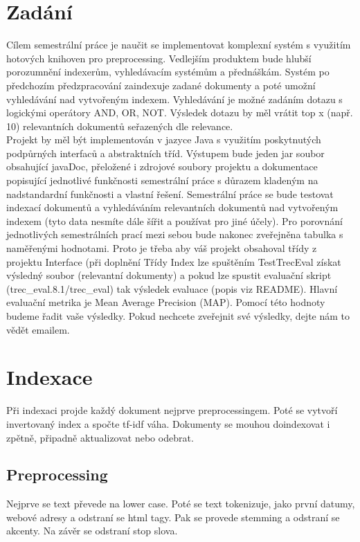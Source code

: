 \setlength{\parskip}{1em}

\chapter{Zadání}

Cílem semestrální práce je naučit se implementovat komplexní systém s využitím hotových knihoven pro preprocessing. Vedlejším produktem bude hlubší porozumnění indexerům, vyhledávacím systémům a přednáškám.
Systém po předchozím předzpracování zaindexuje zadané dokumenty a poté umožní vyhledávání nad vytvořeným indexem. Vyhledávání je možné zadáním dotazu s logickými operátory AND, OR, NOT. Výsledek dotazu by měl vrátit top x (např. 10) relevantních dokumentů seřazených dle relevance.\\
Projekt by měl být implementován v jazyce Java s využitím poskytnutých podpůrných interfaců a abstraktních tříd. Výstupem bude jeden jar soubor obsahující javaDoc, přeložené i zdrojové soubory projektu a dokumentace popisující jednotlivé funkčnosti semestrální práce s důrazem kladeným na nadstandardní funkčnosti a vlastní řešení.
Semestrální práce se bude testovat indexací dokumentů a vyhledáváním relevantních dokumentů nad vytvořeným indexem (tyto data nesmíte dále šířit a používat pro jiné účely). Pro porovnání jednotlivých semestrálních prací mezi sebou bude nakonec zveřejněna tabulka s naměřenými hodnotami. Proto je třeba aby váš projekt obsahoval třídy z projektu Interface (při doplnění Třídy Index lze spuštěním TestTrecEval získat výsledný soubor (relevantní dokumenty) a pokud lze spustit evaluační skript (trec\_eval.8.1/trec\_eval) tak výsledek evaluace (popis viz README). Hlavní evaluační metrika je Mean Average Precision (MAP). Pomocí této hodnoty budeme řadit vaše výsledky. Pokud nechcete zveřejnit své výsledky, dejte nám to vědět emailem.



\chapter{Indexace}
Při indexaci projde každý dokument nejprve preprocessingem. Poté se vytvoří invertovaný index a spočte tf-idf váha. Dokumenty se mouhou doindexovat i zpětně, připadně aktualizovat nebo odebrat.

\section{Preprocessing}
Nejprve se text převede na lower case.  Poté se text tokenizuje, jako první datumy, webové adresy a odstraní se html tagy. Pak se provede stemming a odstraní se akcenty. Na závěr se odstraní stop slova.

